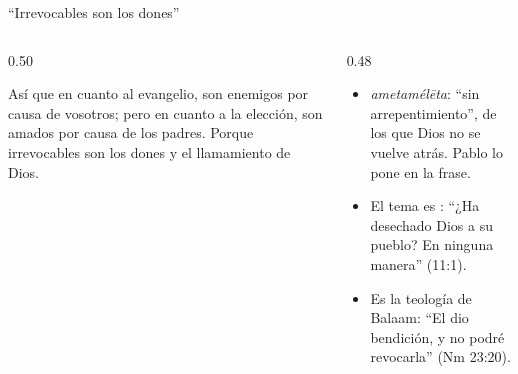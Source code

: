 \begin{frame}{``Irrevocables son los dones''}
\begin{columns}[t,onlytextwidth]
\begin{column}{0.50\textwidth}
\begin{cita}Así que en cuanto al evangelio, son enemigos por causa de vosotros; pero en cuanto a la elección, son amados por causa de los padres. Porque irrevocables son los dones y el llamamiento de Dios.\end{cita}
\begin{center}\end{center}
\end{column}
\begin{column}{0.48\textwidth}\small
\begin{itemize}
\item {} \emph{ametamélēta}: ``sin arrepentimiento'', de los que Dios no se vuelve atrás. Pablo lo pone  en la frase.
\item El tema es : ``¿Ha desechado Dios a su pueblo? En ninguna manera'' (11:1).
\item Es la teología de Balaam: ``El dio bendición, y no podré revocarla'' (Nm 23:20).
\end{itemize}
\end{column}
\end{columns}
\end{frame}

